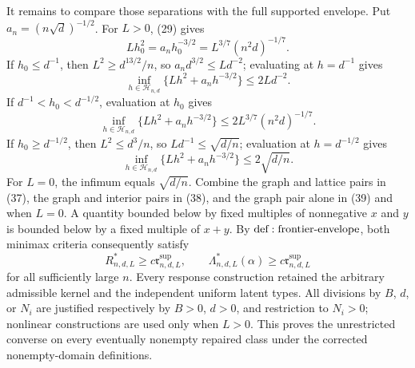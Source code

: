 It remains to compare those separations with the full supported envelope.  Put \(a_n=(n\sqrt d)^{-1/2}\).  For \(L>0\), (29) gives
\[
 Lh_0^2=a_nh_0^{-3/2}=L^{3/7}(n^2d)^{-1/7}.
\tag{36}
\]
If \(h_0\leq d^{-1}\), then \(L^2\geq d^{13/2}/n\), so \(a_nd^{3/2}\leq Ld^{-2}\); evaluating at \(h=d^{-1}\) gives
\[
 \inf_{h\in\mathcal H_{n,d}}
 \{Lh^2+a_nh^{-3/2}\}\leq2Ld^{-2}.
\tag{37}
\]
If \(d^{-1}<h_0<d^{-1/2}\), evaluation at \(h_0\) gives
\[
 \inf_{h\in\mathcal H_{n,d}}
 \{Lh^2+a_nh^{-3/2}\}
 \leq2L^{3/7}(n^2d)^{-1/7}.
\tag{38}
\]
If \(h_0\geq d^{-1/2}\), then \(L^2\leq d^3/n\), so \(Ld^{-1}\leq\sqrt{d/n}\); evaluation at \(h=d^{-1/2}\) gives
\[
 \inf_{h\in\mathcal H_{n,d}}
 \{Lh^2+a_nh^{-3/2}\}\leq2\sqrt{d/n}.
\tag{39}
\]
For \(L=0\), the infimum equals \(\sqrt{d/n}\).  Combine the graph and lattice pairs in (37), the graph and interior pairs in (38), and the graph pair alone in (39) and when \(L=0\).  A quantity bounded below by fixed multiples of nonnegative \(x\) and \(y\) is bounded below by a fixed multiple of \(x+y\).  By \({\rm def:frontier\text{-}envelope}\), both minimax criteria consequently satisfy
\[
 R^*_{n,d,L}\geq c\mathfrak r^{\mathrm{sup}}_{n,d,L},
 \qquad
 \Lambda^*_{n,d,L}(\alpha)
 \geq c\mathfrak r^{\mathrm{sup}}_{n,d,L}
\tag{40}
\]
for all sufficiently large \(n\).  Every response construction retained the arbitrary admissible kernel and the independent uniform latent types.  All divisions by \(B\), \(d\), or \(N_i\) are justified respectively by \(B>0\), \(d>0\), and restriction to \(N_i>0\); nonlinear constructions are used only when \(L>0\).  This proves the unrestricted converse on every eventually nonempty repaired class under the corrected nonempty-domain definitions.